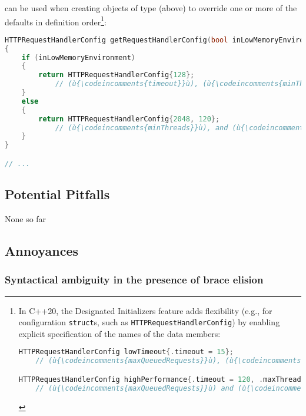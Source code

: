 \noindent {} can be used when creating objects of
type  (above) to override one or more
of the defaults in definition order{\cprotect\footnote{In C++20, the
Designated Initializers feature adds flexibility (e.g., for
configuration \lstinline!struct!s, such as
\lstinline!HTTPRequestHandlerConfig!) by enabling explicit specification
of the names of the data members:

\begin{lstlisting}[language=C++, basicstyle={\ttfamily\footnotesize}]
HTTPRequestHandlerConfig lowTimeout{.timeout = 15};
    // (ù{\codeincomments{maxQueuedRequests}}ù), (ù{\codeincomments{minThreads}}ù), and (ù{\codeincomments{maxThreads}}ù) have their default value.

HTTPRequestHandlerConfig highPerformance{.timeout = 120, .maxThreads = 16};
    // (ù{\codeincomments{maxQueuedRequests}}ù) and (ù{\codeincomments{minThreads}}ù) have their default value.
\end{lstlisting}
      }}:

\begin{lstlisting}[language=C++]
HTTPRequestHandlerConfig getRequestHandlerConfig(bool inLowMemoryEnvironment)
{
    if (inLowMemoryEnvironment)
    {
        return HTTPRequestHandlerConfig{128};
            // (ù{\codeincomments{timeout}}ù), (ù{\codeincomments{minThreads}}ù), and (ù{\codeincomments{maxThreads}}ù) have their default value.
    }
    else
    {
        return HTTPRequestHandlerConfig{2048, 120};
            // (ù{\codeincomments{minThreads}}ù), and (ù{\codeincomments{maxThreads}}ù) have their default value.
    }
}

// ...
\end{lstlisting}


\subsection[Potential Pitfalls]{Potential Pitfalls}\label{potential-pitfalls}

None so far

\subsection[Annoyances]{Annoyances}\label{annoyances}

\subsubsection[Syntactical ambiguity in the presence of brace elision]{Syntactical ambiguity in the presence of brace elision}\label{syntactical-ambiguity-in-the-presence-of-brace-elision}

